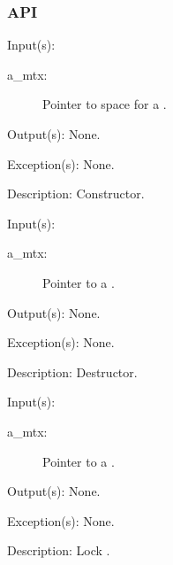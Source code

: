 \subsubsection{API}
\begin{capi}
\label{mtx_new}
	\begin{capilist}
	\item[Input(s): ]
		\begin{description}\item[]
		\item[a\_mtx: ]
			Pointer to space for a .
		\end{description}
	\item[Output(s): ] None.
	\item[Exception(s): ] None.
	\item[Description: ]
		Constructor.
	\end{capilist}
\label{mtx_delete}
	\begin{capilist}
	\item[Input(s): ]
		\begin{description}\item[]
		\item[a\_mtx: ]
			Pointer to a \classname{mtx}.
		\end{description}
	\item[Output(s): ] None.
	\item[Exception(s): ] None.
	\item[Description: ]
		Destructor.
	\end{capilist}
\label{mtx_lock}
	\begin{capilist}
	\item[Input(s): ]
		\begin{description}\item[]
		\item[a\_mtx: ]
			Pointer to a .
		\end{description}
	\item[Output(s): ] None.
	\item[Exception(s): ] None.
	\item[Description: ]
		Lock \cvar{a\_mtx}.
	\end{capilist}
\label{mtx_trylock}
	\begin{capilist}

\end{capilist}
\end{capi}
